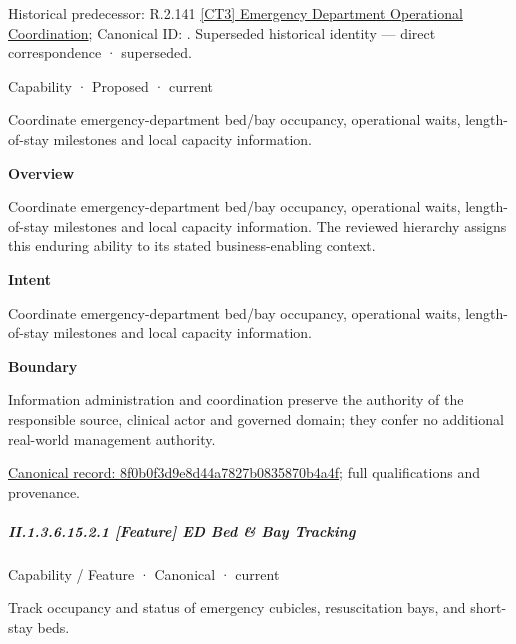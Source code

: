 {\small Historical predecessor: R.2.141 \hyperref[element:15b6d2518e60444098b7c546ca31c49b]{[CT3] Emergency Department Operational Coordination}; Canonical ID: \texttt{}. Superseded historical identity — direct correspondence · superseded.}\par
\label{element:8f0b0f3d9e8d44a7827b0835870b4a4f}
{\small Capability · Proposed · current}\par

Coordinate emergency-department bed/bay occupancy, operational waits, length-of-stay milestones and local capacity information.



\textbf{Overview}



Coordinate emergency-department bed/bay occupancy, operational waits, length-of-stay milestones and local capacity information. The reviewed hierarchy assigns this enduring ability to its stated business-enabling context.



\textbf{Intent}



Coordinate emergency-department bed/bay occupancy, operational waits, length-of-stay milestones and local capacity information.



\textbf{Boundary}



Information administration and coordination preserve the authority of the responsible source, clinical actor and governed domain; they confer no additional real-world management authority.


{\footnotesize \href{../../../../continuum/strategy/capability/8f0b0f3d9e8d44a7827b0835870b4a4f.md}{Canonical record: 8f0b0f3d9e8d44a7827b0835870b4a4f}; full qualifications and provenance.}\par
\subparagraph*{II.1.3.6.15.2.1 [Feature] ED Bed \& Bay Tracking}
\label{navigation:II.1.3.6.15.2.1}

\label{element:7c0251128fc942d88bf25141421fd909}
{\small Capability / Feature · Canonical · current}\par

Track occupancy and status of emergency cubicles, resuscitation bays, and short-stay beds.



